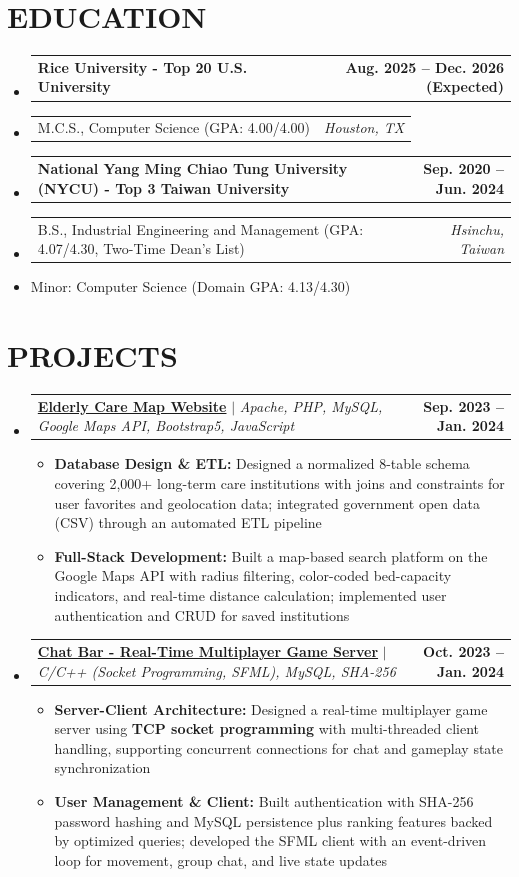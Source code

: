 \documentclass[letterpaper,11pt]{article}
\makeatletter
\newcommand{\resumeItem}[1]{\item\small{#1}}
\newcommand{\resumeEntryNoOrg}[2]{
  \item
    \begin{tabular*}{1.0\textwidth}[t]{l@{\extracolsep{\fill}}r}
      \textbf{#1} & \textbf{\small #2} \\
    \end{tabular*}\vspace{3pt}
}
\newcommand{\resumeEntryDetail}[2]{
  \item
    \begin{tabular*}{1.0\textwidth}[t]{l@{\extracolsep{\fill}}r}
      \small#1 & \textit{\small #2} \\
    \end{tabular*}
}
\newcommand{\resumeProjectEntry}[2]{
    \item
    \begin{tabular*}{\textwidth}{l@{\extracolsep{\fill}}r}
      \small#1 & \textbf{\small #2}\\
    \end{tabular*}
}
\newcommand{\resumeEntryListStart}{\begin{itemize}[leftmargin=0.0in, label={}]}
\newcommand{\resumeEntryListEnd}{\end{itemize}}
\newcommand{\resumeItemListStart}{\begin{itemize}[label=$\vcenter{\hbox{\tiny$\bullet$}}$]}
\newcommand{\resumeItemListEnd}{\end{itemize}}
\makeatother
\begin{document}
\vspace{-9pt}

\section{EDUCATION}
\resumeEntryListStart
  \resumeEntryNoOrg
    {Rice University - Top 20 U.S. University}{Aug. 2025 -- Dec. 2026 (Expected)}
    \vspace{-20pt}
    \resumeEntryDetail{M.C.S., Computer Science (GPA: 4.00/4.00)}{Houston, TX}
    \vspace{-12pt}
  \resumeEntryNoOrg
    {National Yang Ming Chiao Tung University (NYCU) - Top 3 Taiwan University}{Sep. 2020 -- Jun. 2024}
    \vspace{-20pt}
    \resumeEntryDetail{B.S., Industrial Engineering and Management (GPA: 4.07/4.30, Two-Time Dean's List)}{Hsinchu, Taiwan}
    \vspace{-15pt}
    \resumeItem{Minor: Computer Science (Domain GPA: 4.13/4.30)}
\resumeEntryListEnd

\vspace{-6pt}

\section{PROJECTS}
\vspace{-1pt}
\resumeEntryListStart
  \resumeProjectEntry
    {\textbf{\textcolor{RoyalBlue}{\href{https://github.com/yarikama/Elderly-Care-Map-Website}{Elderly Care Map Website}}} $|$ \emph{Apache, PHP, MySQL, Google Maps API, Bootstrap5, JavaScript}}{Sep. 2023 -- Jan. 2024}
    \resumeItemListStart
      \resumeItem{\textbf{Database Design \& ETL:} Designed a normalized 8-table schema covering 2,000+ long-term care institutions with joins and constraints for user favorites and geolocation data; integrated government open data (CSV) through an automated ETL pipeline}
      \resumeItem{\textbf{Full-Stack Development:} Built a map-based search platform on the Google Maps API with radius filtering, color-coded bed-capacity indicators, and real-time distance calculation; implemented user authentication and CRUD for saved institutions}
    \resumeItemListEnd
  \resumeProjectEntry
    {\textbf{\textcolor{RoyalBlue}{\href{https://github.com/yarikama/Chat_Bar}{Chat Bar - Real-Time Multiplayer Game Server}}} $|$ \emph{C/C++ (Socket Programming, SFML), MySQL, SHA-256}}{Oct. 2023 -- Jan. 2024}
    \resumeItemListStart
      \resumeItem{\textbf{Server-Client Architecture:} Designed a real-time multiplayer game server using \textbf{TCP socket programming} with multi-threaded client handling, supporting concurrent connections for chat and gameplay state synchronization}
      \resumeItem{\textbf{User Management \& Client:} Built authentication with SHA-256 password hashing and MySQL persistence plus ranking features backed by optimized queries; developed the SFML client with an event-driven loop for movement, group chat, and live state updates}
    \resumeItemListEnd
\resumeEntryListEnd
\end{document}

